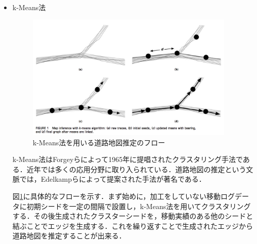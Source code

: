 \begin{itemize}
	\item k-Means法\\
	      \begin{figure}
	      	\centering
	      	\includegraphics[width=10cm]{fig/kmeans-inf.png}
	      	\caption{k-Means法を用いる道路地図推定のフロー \protect \footnotemark}
	      	\label{k-means-inf}
          \end{figure}
	      k-Means法はForgeyらによって1965年に提唱されたクラスタリング手法である\cite{Forgy}．近年では多くの応用分野に取り入られている．道路地図の推定という文脈では，Edelkampらによって提案された手法\cite{Edelkamp}が著名である．
	      	      	      	      	      
	      図\ref{k-means-inf}に具体的なフローを示す．まず始めに，加工をしていない移動ログデータに初期シードを一定の間隔で設置し，k-Means法を用いてクラスタリングする．その後生成されたクラスターシードを，移動実績のある他のシードと結ぶことでエッジを生成する．これを繰り返すことで生成されたエッジから道路地図を推定することが出来る．
	      	      	      	      	      

\end{itemize}
